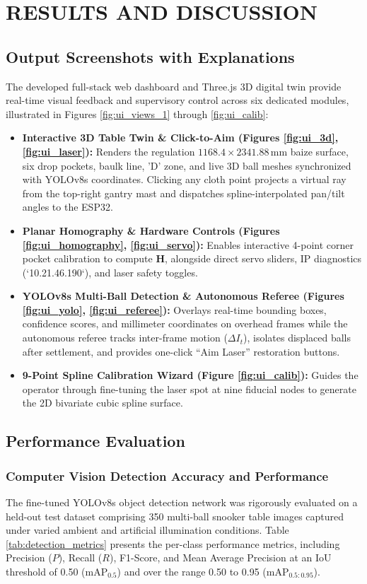 \chapter{RESULTS AND DISCUSSION}

\section{Output Screenshots with Explanations}
The developed full-stack web dashboard and Three.js 3D digital twin provide real-time visual feedback and supervisory control across six dedicated modules, illustrated in Figures \ref{fig:ui_views_1} through \ref{fig:ui_calib}:
\begin{itemize}
    \item \textbf{Interactive 3D Table Twin \& Click-to-Aim (Figures \ref{fig:ui_3d}, \ref{fig:ui_laser}):} Renders the regulation $1168.4 \times 2341.88\,\text{mm}$ baize surface, six drop pockets, baulk line, 'D' zone, and live 3D ball meshes synchronized with YOLOv8s coordinates. Clicking any cloth point projects a virtual ray from the top-right gantry mast and dispatches spline-interpolated pan/tilt angles to the ESP32.
    \item \textbf{Planar Homography \& Hardware Controls (Figures \ref{fig:ui_homography}, \ref{fig:ui_servo}):} Enables interactive 4-point corner pocket calibration to compute $\mathbf{H}$, alongside direct servo sliders, IP diagnostics (`10.21.46.190`), and laser safety toggles.
    \item \textbf{YOLOv8s Multi-Ball Detection \& Autonomous Referee (Figures \ref{fig:ui_yolo}, \ref{fig:ui_referee}):} Overlays real-time bounding boxes, confidence scores, and millimeter coordinates on overhead frames while the autonomous referee tracks inter-frame motion ($\Delta I_t$), isolates displaced balls after settlement, and provides one-click ``Aim Laser'' restoration buttons.
    \item \textbf{9-Point Spline Calibration Wizard (Figure \ref{fig:ui_calib}):} Guides the operator through fine-tuning the laser spot at nine fiducial nodes to generate the 2D bivariate cubic spline surface.
\end{itemize}

\section{Performance Evaluation}
\subsection{Computer Vision Detection Accuracy and Performance}
The fine-tuned YOLOv8s object detection network was rigorously evaluated on a held-out test dataset comprising 350 multi-ball snooker table images captured under varied ambient and artificial illumination conditions. Table \ref{tab:detection_metrics} presents the per-class performance metrics, including Precision ($P$), Recall ($R$), F1-Score, and Mean Average Precision at an IoU threshold of 0.50 ($\text{mAP}_{0.5}$) and over the range 0.50 to 0.95 ($\text{mAP}_{0.5:0.95}$).

